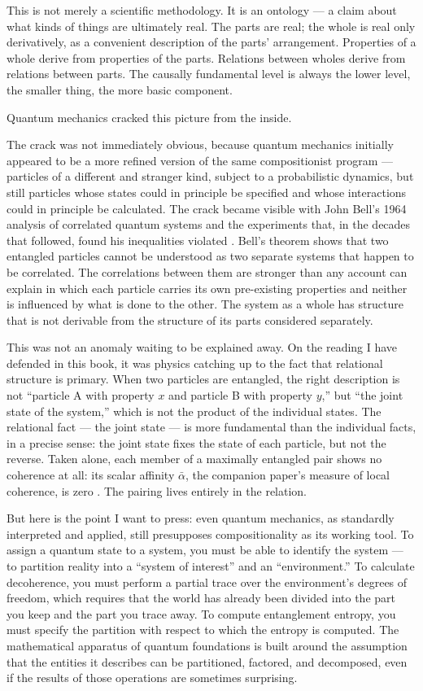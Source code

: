 This is not merely a scientific methodology. It is an ontology --- a claim
about what kinds of things are ultimately real. The parts are real; the whole
is real only derivatively, as a convenient description of the parts'
arrangement. Properties of a whole derive from properties of the parts.
Relations between wholes derive from relations between parts. The causally
fundamental level is always the lower level, the smaller thing, the more
basic component.

Quantum mechanics cracked this picture from the inside.

The crack was not immediately obvious, because quantum mechanics initially
appeared to be a more refined version of the same compositionist program ---
particles of a different and stranger kind, subject to a probabilistic
dynamics, but still particles whose states could in principle be specified and
whose interactions could in principle be calculated. The crack became visible
with John Bell's 1964 analysis of correlated quantum systems
\citep{Bell1964} and the experiments that, in the decades that followed,
found his inequalities violated \citep{Aspect1982}. Bell's theorem shows that two entangled particles
cannot be understood as two separate systems that happen to be correlated. The
correlations between them are stronger than any account can explain in which
each particle carries its own pre-existing properties and neither is influenced
by what is done to the other. The system as
a whole has structure that is not derivable from the structure of its parts
considered separately.

This was not an anomaly waiting to be explained away. On the reading I have
defended in this book, it was physics catching
up to the fact that relational structure is primary. When two particles are
entangled, the right description is not ``particle A with property $x$ and
particle B with property $y$,'' but ``the joint state of the system,'' which
is not the product of the individual states. The relational fact --- the joint
state --- is more fundamental than the individual facts, in a precise sense:
the joint state fixes the state of each particle, but not the reverse. Taken
alone, each member of a maximally entangled pair shows no coherence at all: its
scalar affinity $\bar{\alpha}$, the companion paper's measure of local
coherence, is zero \citep{AdamsRCT}. The pairing lives entirely in the relation.

But here is the point I want to press: even quantum mechanics, as standardly
interpreted and applied, still presupposes compositionality as its working
tool. To assign a quantum state to a system, you must be able to identify the
system --- to partition reality into a ``system of interest'' and an
``environment.'' To calculate decoherence, you must perform a partial trace
over the environment's degrees of freedom, which requires that the world has
already been divided into the part you keep and the part you trace away. To
compute entanglement entropy,
you must specify the partition with respect to which the entropy is computed.
The mathematical apparatus of quantum foundations is built around the
assumption that the entities it describes can be partitioned, factored, and
decomposed, even if the results of those operations are sometimes surprising.

